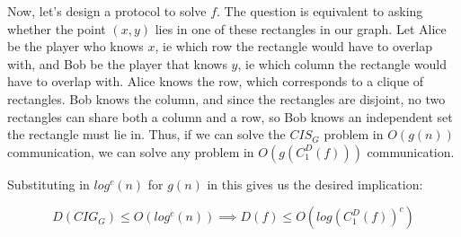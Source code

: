 \documentclass{article}
\newenvironment{problem}[2][Problem]{\begin{trivlist}
\item[\hskip \labelsep {\bfseries #1}\hskip \labelsep {\bfseries #2.}]}{\end{trivlist}}
\begin{document}
\begin{problem}{5}
\begin{enumerate}
      Now, let's design a protocol to solve $f$. The question is
      equivalent to asking whether the point $(x,y)$ lies in one of
      these rectangles in our graph. Let Alice be the player who knows
      $x$, ie which row the rectangle would have to overlap with, and Bob
      be the player that knows $y$, ie which column the rectangle
      would have to overlap with. Alice knows the
      row, which corresponds to a clique of rectangles. Bob knows the
      column, and since the rectangles are disjoint, no two rectangles
      can share both a column and a row, so Bob knows an independent
      set the rectangle must lie in. Thus, if we can solve the $CIS_G$
      problem in $O(g(n))$ communication, we can solve any problem in
      $O(g(C_1^D(f)))$ communication.

      Substituting in $log^c(n)$ for $g(n)$ in this gives us the
      desired implication:

      \begin{equation}
        D(CIG_G) \leq O(log^c(n)) \implies D(f) \leq O(log(C_1^D(f))^c)
      \end{equation}
  \end{enumerate}

\end{problem}
  
\end{document}
